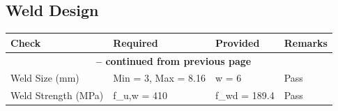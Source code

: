 \documentclass[12pt]{article}
\begin{document}
\subsection{Weld Design}

\begin{longtable}{llll}
\cellcolor{OsdagGreen} Check & \cellcolor{OsdagGreen} Required & \cellcolor{OsdagGreen} Provided & \cellcolor{OsdagGreen} Remarks \\ \hline
\endfirsthead
\multicolumn{4}{c}{{\bfseries \tablename\ \thetable{} -- continued from previous page}} \\
\endhead
\endfoot
\endlastfoot
Weld Size (mm) & Min = 3, Max = 8.16 & w = 6 & Pass \\
\hline
Weld Strength (MPa) & f\_u,w = 410 & f\_wd = 189.4 & Pass \\
\hline
\end{longtable}

\FloatBarrier
\end{document}
